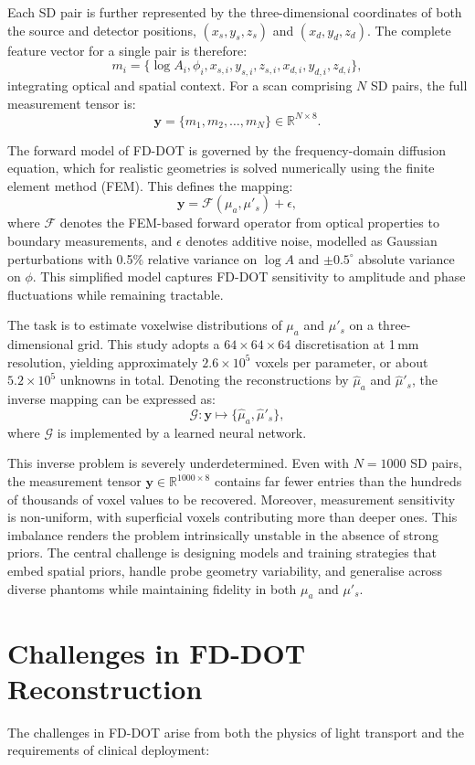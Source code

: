 Each SD pair is further represented by the three-dimensional coordinates of both the source and detector positions, $(x_s, y_s, z_s)$ and $(x_d, y_d, z_d)$. The complete feature vector for a single pair is therefore:
\[
m_i = \{ \log A_i, \phi_i, x_{s,i}, y_{s,i}, z_{s,i}, x_{d,i}, y_{d,i}, z_{d,i} \},
\]
integrating optical and spatial context. For a scan comprising $N$ SD pairs, the full measurement tensor is:
\[
\mathbf{y} = \{ m_1, m_2, \dots, m_N \} \in \mathbb{R}^{N \times 8}.
\]

The forward model of FD-DOT is governed by the frequency-domain diffusion equation, which for realistic geometries is solved numerically using the finite element method (FEM). This defines the mapping:
\[
\mathbf{y} = \mathcal{F}(\mu_a, \mu'_s) + \epsilon,
\]
where $\mathcal{F}$ denotes the FEM-based forward operator from optical properties to boundary measurements, and $\epsilon$ denotes additive noise, modelled as Gaussian perturbations with 0.5\% relative variance on $\log A$ and $\pm 0.5^\circ$ absolute variance on $\phi$. This simplified model captures FD-DOT sensitivity to amplitude and phase fluctuations while remaining tractable.

The task is to estimate voxelwise distributions of $\mu_a$ and $\mu'_s$ on a three-dimensional grid. This study adopts a $64 \times 64 \times 64$ discretisation at 1\,mm resolution, yielding approximately $2.6 \times 10^5$ voxels per parameter, or about $5.2 \times 10^5$ unknowns in total. Denoting the reconstructions by $\hat{\mu}_a$ and $\hat{\mu}'_s$, the inverse mapping can be expressed as:
\[
\mathcal{G}: \mathbf{y} \mapsto \{ \hat{\mu}_a, \hat{\mu}'_s \},
\]
where $\mathcal{G}$ is implemented by a learned neural network.

This inverse problem is severely underdetermined. Even with $N=1000$ SD pairs, the measurement tensor $\mathbf{y} \in \mathbb{R}^{1000 \times 8}$ contains far fewer entries than the hundreds of thousands of voxel values to be recovered. Moreover, measurement sensitivity is non-uniform, with superficial voxels contributing more than deeper ones. This imbalance renders the problem intrinsically unstable in the absence of strong priors. The central challenge is designing models and training strategies that embed spatial priors, handle probe geometry variability, and generalise across diverse phantoms while maintaining fidelity in both $\mu_a$ and $\mu'_s$.

\section{Challenges in FD-DOT Reconstruction}
The challenges in FD-DOT arise from both the physics of light transport and the requirements of clinical deployment:

